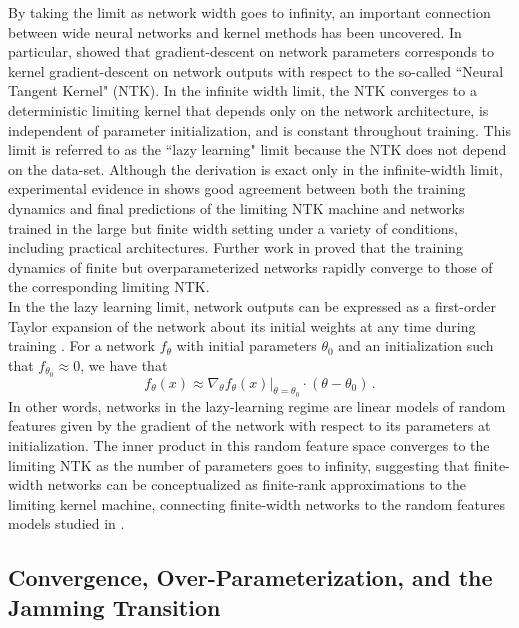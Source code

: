 \documentclass[a4paper, 12pt]{article}
\begin{document}
By taking the limit as network width goes to infinity, an important connection between wide neural networks and kernel methods has been uncovered. In particular, \cite{jacotNeuralTangentKernel2018} showed that gradient-descent on network parameters corresponds to kernel gradient-descent on network outputs with respect to the so-called ``Neural Tangent Kernel" (NTK). In the infinite width limit, the NTK converges to a deterministic limiting kernel that depends only on the network architecture, is independent of parameter initialization, and is constant throughout training. This limit is referred to as the ``lazy learning" limit because the NTK does not depend on the data-set. Although the derivation is exact only in the infinite-width limit, experimental evidence in \cite{jacotNeuralTangentKernel2018} shows good agreement between both the training dynamics and final predictions of the limiting NTK machine and networks trained in the large but finite width setting under a variety of conditions, including practical architectures. Further work in \cite{allen-zhuConvergenceTheoryDeep2019} proved that the training dynamics of finite but overparameterized networks rapidly converge to those of the corresponding limiting NTK.\\

In the the lazy learning limit, network outputs can be expressed as a first-order Taylor expansion of the network about its initial weights at any time during training \cite{leeWideNeuralNetworks2019}. For a network $f_\theta$ with initial parameters $\theta_0$ and an initialization such that $f_{\theta_0} \approx 0$, we have that
\begin{equation}
    f_\theta(x) \approx \nabla_\theta \left.f_\theta(x)\right|_{\theta=\theta_0} \cdot (\theta - \theta_0)\,.
\end{equation}
In other words, networks in the lazy-learning regime are linear models of random features given by the gradient of the network with respect to its parameters at initialization. The inner product in this random feature space converges to the limiting NTK as the number of parameters goes to infinity, suggesting that finite-width networks can be conceptualized as finite-rank approximations to the limiting kernel machine, connecting finite-width networks to the random features models studied in \cite{rahimiRandomFeaturesLargeScale2008}.

\subsection{Convergence, Over-Parameterization, and the Jamming Transition}
\end{document}
